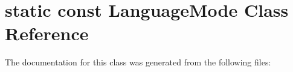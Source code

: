 \hypertarget{classstatic_01const_01LanguageMode}{}\section{static const Language\+Mode Class Reference}
\label{classstatic_01const_01LanguageMode}


The documentation for this class was generated from the following files\+: